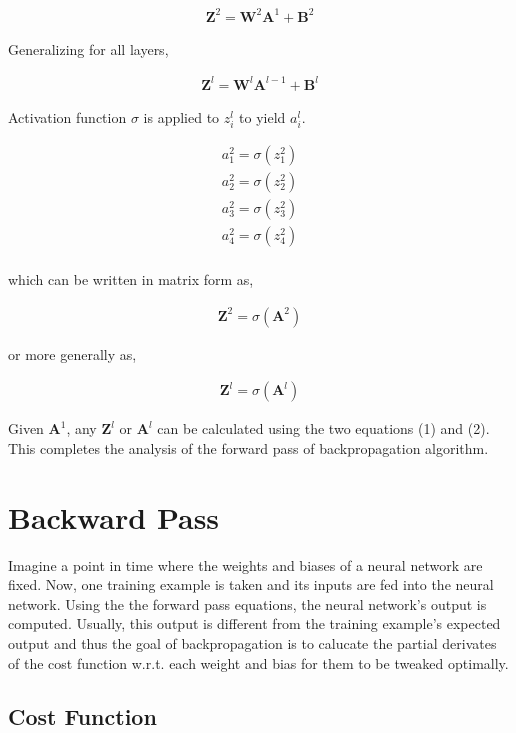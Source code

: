 \documentclass[11pt, a4paper]{article}
\begin{document}
\begin{align*}
	\boldsymbol{Z}^2 = \boldsymbol{W}^2 \boldsymbol{A}^1 + \boldsymbol{B}^2 
\end{align*}

Generalizing for all layers,

\begin{align}
	\boldsymbol{Z}^l = \boldsymbol{W}^l \boldsymbol{A}^{l-1} + \boldsymbol{B}^l 
\end{align}

Activation function $\sigma$ is applied to $z^l_i$ to yield $a^l_i$.

\begin{align*}
	a^2_1 = \sigma(z^2_1) \\
	a^2_2 = \sigma(z^2_2) \\
	a^2_3 = \sigma(z^2_3) \\
	a^2_4 = \sigma(z^2_4) \\
\end{align*} 

which can be written in matrix form as,

\begin{align*}
	\boldsymbol{Z}^2 = \sigma(\boldsymbol{A}^2) 
\end{align*}

or more generally as,

\begin{align}
	\boldsymbol{Z}^l = \sigma(\boldsymbol{A}^l) 
\end{align}

Given $\boldsymbol{A}^1$, any $\boldsymbol{Z}^l$ or $\boldsymbol{A}^l$ can be calculated using the two equations (1) and (2). This completes the analysis of the forward pass of backpropagation algorithm.

\section{Backward Pass}

Imagine a point in time where the weights and biases of a neural network are fixed. Now, one training example is taken and its inputs are fed into the neural network. Using the the forward pass equations, the neural network's output is computed. Usually, this output is different from the training example's expected output and thus the goal of backpropagation is to calucate the partial derivates of the cost function w.r.t. each weight and bias for them to be tweaked optimally.

\subsection{Cost Function}
\end{document}
